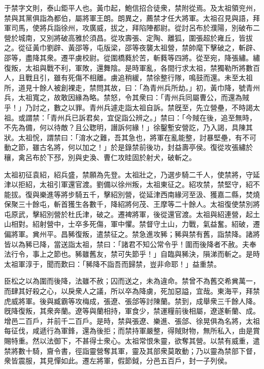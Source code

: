 
\begin{pinyinscope}
于禁字文則，泰山鉅平人也。黃巾起，鮑信招合徒衆，禁附從焉。及太祖領兖州，禁與其黨俱詣為都伯，屬將軍王朗。朗異之，薦禁才任大將軍。太祖召見與語，拜軍司馬，使將兵詣徐州，攻廣威，拔之，拜陷陣都尉。從討呂布於濮陽，別破布二營於城南，又別將破高雅於須昌。從攻壽張、定陶、離狐，圍張超於雍丘，皆拔之。從征黃巾劉辟、黃邵等，屯版梁，邵等夜襲太祖營，禁帥麾下擊破之，斬辟、邵等，盡降其衆。遷平虜校尉。從圍橋蕤於苦，斬蕤等四將。從至宛，降張繡。繡復叛，太祖與戰不利，軍敗，還舞陰。是時軍亂，各間行求太祖，禁獨勒所將數百人，且戰且引，雖有死傷不相離。虜追稍緩，禁徐整行隊，鳴鼓而還。未至太祖所，道見十餘人被創裸走，禁問其故，曰：「為青州兵所劫。」初，黃巾降，號青州兵，太祖寬之，故敢因緣為略。禁怒，令其衆曰：「青州兵同屬曹公，而還為賊乎！」乃討之，數之以罪。青州兵遽走詣太祖自訴。禁旣至，先立營壘，不時謁太祖。或謂禁：「青州兵已訴君矣，宜促詣公辨之。」禁曰：「今賊在後，追至無時，不先為備，何以待敵？且公聦明，譖訴何緣！」徐鑿塹安營訖，乃入謁，具陳其狀。太祖恱，謂禁曰：「淯水之難，吾其急也，將軍在亂能整，討暴堅壘，有不可動之節，雖古名將，何以加之！」於是錄禁前後功，封益壽亭侯。復從攻張繡於穰，禽呂布於下邳，別與史渙、曹仁攻眭固於射犬，破斬之。

太祖初征袁紹，紹兵盛，禁願為先登。太祖壯之，乃選步騎二千人，使禁將，守延津以拒紹，太祖引軍還官渡。劉備以徐州叛，太祖東征之。紹攻禁，禁堅守，紹不能拔。復與樂進等將步騎五千，擊紹別營，從延津西南緣河至汲、獲嘉二縣，焚燒保聚三十餘屯，斬首獲生各數千，降紹將何茂、王摩等二十餘人。太祖復使禁別將屯原武，擊紹別營於杜氏津，破之。遷裨將軍，後從還官渡。太祖與紹連營，起土山相對。紹射營中，士卒多死傷，軍中懼。禁督守土山，力戰，氣益奮。紹破，遷偏將軍。兾州平。昌豨復叛，遣禁征之。禁急進攻豨；豨與禁有舊，詣禁降。諸將皆以為豨已降，當送詣太祖，禁曰：「諸君不知公常令乎！圍而後降者不赦。夫奉法行令，事上之節也。豨雖舊友，禁可失節乎！」自臨與豨決，隕涕而斬之。是時太祖軍淳于，聞而歎曰：「豨降不詣吾而歸禁，豈非命耶！」益重禁。

臣松之以為圍而後降，法雖不赦；囚而送之，未為違命。禁曾不為舊交希兾萬一，而肆其好殺之心，以戾衆人之議，所以卒為降虜，死加惡謚，宜哉。東海平，拜禁虎威將軍。後與臧霸等攻梅成，張遼、張郃等討陳蘭。禁到，成舉衆三千餘人降。旣降復叛，其衆奔蘭。遼等與蘭相持，軍食少，禁運糧前後相屬，遼遂斬蘭、成。增邑二百戶，并前千二百戶。是時，禁與張遼、樂進、張郃、徐晃俱為名將，太祖每征伐，咸遞行為軍鋒，還為後拒；而禁持軍嚴整，得賊財物，無所私入，由是賞賜特重。然以法御下，不甚得士衆心。太祖常恨朱靈，欲奪其營。以禁有威重，遣禁將數十騎，齎令書，徑詣靈營奪其軍，靈及其部衆莫敢動；乃以靈為禁部下督，衆皆震服，其見憚如此。遷左將軍，假節鉞，分邑五百戶，封一子列侯。


\end{pinyinscope}
